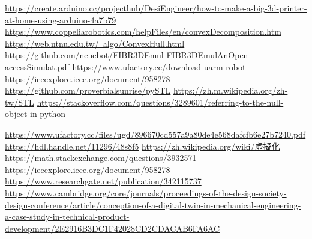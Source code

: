 \newpage
\renewcommand\bibname{參~考~文~獻}
\begin{thebibliography}{99}  %
\href{https://create.arduino.cc/projecthub/DesiEngineer/how-to-make-a-big-3d-printer-at-home-using-arduino-4a7b79}{https://create.arduino.cc/projecthub/DesiEngineer/how-to-make-a-big-3d-printer-at-home-using-arduino-4a7b79}
\href{https://www.coppeliarobotics.com/helpFiles/en/convexDecomposition.htm}{https://www.coppeliarobotics.com/helpFiles/en/convexDecomposition.htm}
\href{https://web.ntnu.edu.tw/~algo/ConvexHull.html}{https://web.ntnu.edu.tw/~algo/ConvexHull.html}
\href{https://github.com/neuebot/FIBR3DEmul}{https://github.com/neuebot/FIBR3DEmul}
\href{https://repositorium.sdum.uminho.pt/bitstream/1822/69730/1/Faria2020_Article_FIBR3DEmulAnOpen-accessSimulat.pdf}{FIBR3DEmulAnOpen-accessSimulat.pdf}
\href{https://www.ufactory.cc/download-uarm-robot}{https://www.ufactory.cc/download-uarm-robot}
\href{https://ieeexplore.ieee.org/document/958278}{https://ieeexplore.ieee.org/document/958278}
\href{https://github.com/proverbialsunrise/pySTL}{https://github.com/proverbialsunrise/pySTL}
\href{https://zh.m.wikipedia.org/zh-tw/STL}{https://zh.m.wikipedia.org/zh-tw/STL}
\href{https://stackoverflow.com/questions/3289601/referring-to-the-null-object-in-python}{https://stackoverflow.com/questions/3289601/referring-to-the-null-object-in-python}

\href{https://www.ufactory.cc/_files/ugd/896670_cd557a9a80de4e568dafcfb6e27b7240.pdf}{https://www.ufactory.cc/files/ugd/896670cd557a9a80de4e568dafcfb6e27b7240.pdf}
\href{https://hdl.handle.net/11296/48s8f5}{https://hdl.handle.net/11296/48s8f5}
\href{https://zh.wikipedia.org/wiki/%E8%99%9B%E6%93%AC%E5%8C%96}{https://zh.wikipedia.org/wiki/虛擬化}
\href{https://math.stackexchange.com/questions/3932571/how-to-integrate-over-all-space-in-polar-coordinates}{https://math.stackexchange.com/questions/3932571}
\href{https://ieeexplore.ieee.org/document/958278}{https://ieeexplore.ieee.org/document/958278}
\href{https://www.researchgate.net/publication/342115737_WHAT_IS_A_DIGITAL_TWIN_-_DEFINITIONS_AND_INSIGHTS_FROM_AN_INDUSTRIAL_CASE_STUDY_IN_TECHNICAL_PRODUCT_DEVELOPMENT}{https://www.researchgate.net/publication/342115737}
\href{https://www.cambridge.org/core/journals/proceedings-of-the-design-society-design-conference/article/conception-of-a-digital-twin-in-mechanical-engineering-a-case-study-in-technical-product-development/2E2916B3DC1F42028CD2CDACAB6FA6AC}{https://www.cambridge.org/core/journals/proceedings-of-the-design-society-design-conference/article/conception-of-a-digital-twin-in-mechanical-engineering-a-case-study-in-technical-product-development/2E2916B3DC1F42028CD2CDACAB6FA6AC}
%
\end{thebibliography}
\newpage 